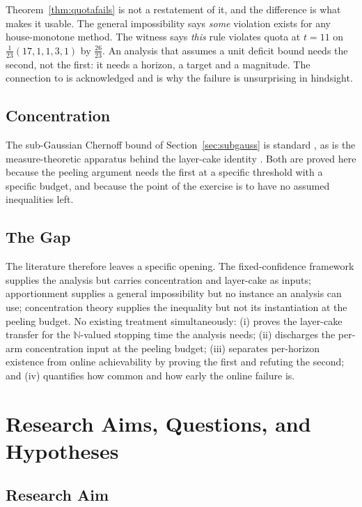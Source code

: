 \documentclass[conference]{IEEEtran}
\theoremstyle{definition}
\begin{document}
Theorem~\ref{thm:quotafails} is not a restatement of it, and the difference is what makes it
usable. The general impossibility says \emph{some} violation exists for any house-monotone
method. The witness says \emph{this} rule violates quota at $t=11$ on
$\frac{1}{23}(17,1,1,3,1)$ by $\frac{26}{23}$. An analysis that assumes a unit deficit bound
needs the second, not the first: it needs a horizon, a target and a magnitude. The connection
to \cite{balinski1982} is acknowledged and is why the failure is unsurprising in hindsight.

\subsection{Concentration}

The sub-Gaussian Chernoff bound of Section~\ref{sec:subgauss} is standard
\cite{boucheron2013}, as is the measure-theoretic apparatus behind the layer-cake identity
\cite{durrett2019}. Both are proved here because the peeling argument needs the first at a
specific threshold with a specific budget, and because the point of the exercise is to have no
assumed inequalities left.

\subsection{The Gap}

The literature therefore leaves a specific opening. The fixed-confidence framework supplies
the analysis but carries concentration and layer-cake as inputs; apportionment supplies a
general impossibility but no instance an analysis can use; concentration theory supplies the
inequality but not its instantiation at the peeling budget. No existing treatment
simultaneously: (i) proves the layer-cake transfer for the $\mathbb{N}$-valued stopping time
the analysis needs; (ii) discharges the per-arm concentration input at the peeling budget;
(iii) separates per-horizon existence from online achievability by proving the first and
refuting the second; and (iv) quantifies how common and how early the online failure is.

\section{Research Aims, Questions, and Hypotheses}

\subsection{Research Aim}
\end{document}
